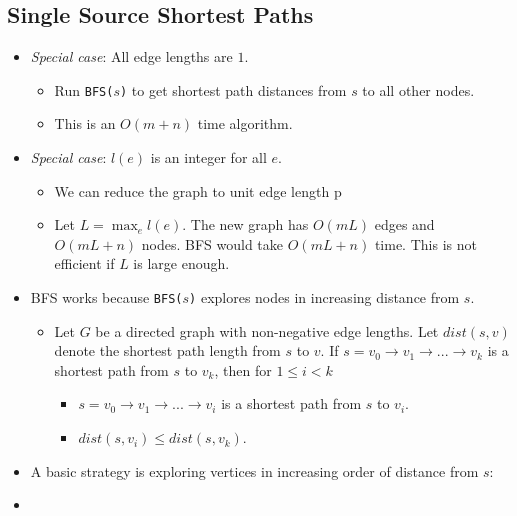 \subsection{Single Source Shortest Paths}
\begin{itemize}
    \item \textit{Special case}: All edge lengths are $1$.
    \begin{itemize}
        \item Run \texttt{BFS($s$)} to get shortest path distances from $s$ to all other nodes.
        \item This is an $O(m + n)$ time algorithm.
    \end{itemize}
    \item \textit{Special case}: $l(e)$ is an integer for all $e$.
    \begin{itemize}
        \item We can reduce the graph to unit edge length p
        \item Let $L = \max_e l(e)$. The new graph has $O(mL)$ edges and $O(mL + n)$ nodes. BFS would take $O(mL + n)$ time. This is not efficient if $L$ is large enough.
    \end{itemize}
    \item BFS works because \texttt{BFS($s$)} explores nodes in increasing distance from $s$.
    \begin{itemize}
        \item Let $G$ be a directed graph with non-negative edge lengths. Let $dist(s, v)$ denote the shortest path length from $s$ to $v$. If $s = v_0 \rightarrow v_1 \rightarrow ... \rightarrow v_k$ is a shortest path from $s$ to $v_k$, then for $1 \leq i < k$
        \begin{itemize}
            \item $s = v_0 \rightarrow v_1 \rightarrow ... \rightarrow v_i$ is a shortest path from $s$ to $v_i$.
            \item $dist(s, v_i) \leq dist(s, v_k)$.
        \end{itemize}
    \end{itemize}
    \item A basic strategy is exploring vertices in increasing order of distance from $s$:
    \item[] 
\end{itemize}

